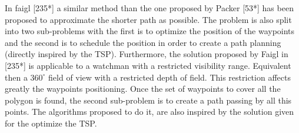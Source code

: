 In faigl [235*] a similar method than the one proposed by Packer [53*] has been proposed to approximate the shorter path as possible. The problem is also split into two sub-problems with the first is to optimize the position of the waypoints and the second is to schedule the position in order to create a path planning (directly inspired by the TSP). 
 Furthermore, the solution proposed by Faigl in [235*] is applicable to a watchman with a restricted visibility range. Equivalent then a $360^\circ$ field of view with a restricted depth of field. This restriction affects greatly the waypoints positioning.
 Once the set of waypoints to cover all the polygon is found, the second sub-problem is to create a path passing by all this points.  The algorithms proposed  to do it, are also inspired by the solution given for the optimize the TSP.




